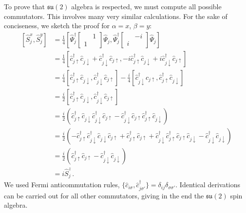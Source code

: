 \begin{tabproof}
	
	To prove that $\mathfrak{su}(2)$ algebra is respected, we must compute all possible commutators. This involves many very similar calculations. For the sake of conciseness, we sketch the proof for $\alpha=x$, $\beta=y$:
	\[
	\begin{aligned}
		\left[ \hat S_j^x, \hat S_j^y \right] &= \frac{1}{4} \left[
			\hat \Psi_j^\dagger \begin{bmatrix}
				& 1 \\
				1 &
			\end{bmatrix} \hat \Psi_j, \hat \Psi_j^\dagger \begin{bmatrix}
				& -i \\
				i &
			\end{bmatrix} \hat \Psi_j
		\right] \\
		&= \frac{1}{4} \left[
			\hat c_{j\uparrow}^\dagger \hat c_{j\downarrow} + \hat c_{j\downarrow}^\dagger \hat c_{j\uparrow}, -i\hat c_{j\uparrow}^\dagger \hat c_{j\downarrow} + i \hat c_{j\downarrow}^\dagger \hat c_{j\uparrow}
		\right] \\
		&= \frac{i}{4} \left[
			\hat c_{j\uparrow}^\dagger \hat c_{j\downarrow}, \hat c_{j\downarrow}^\dagger \hat c_{j\uparrow}
		\right] - \frac{i}{4} \left[
			\hat c_{j\downarrow}^\dagger \hat c_{j\uparrow}, \hat c_{j\uparrow}^\dagger \hat c_{j\downarrow}
		\right] \\
		&= \frac{i}{2} \left[
			\hat c_{j\uparrow}^\dagger \hat c_{j\downarrow}, \hat c_{j\downarrow}^\dagger \hat c_{j\uparrow}
		\right] \\
		&= \frac{i}{2} \left(
			\hat c_{j\uparrow}^\dagger \hat c_{j\downarrow} \hat c_{j\downarrow}^\dagger \hat c_{j\uparrow} - \hat c_{j\downarrow}^\dagger \hat c_{j\uparrow} \hat c_{j\uparrow}^\dagger \hat c_{j\downarrow}
		\right) \\
		&= \frac{i}{2} \left(
			- \hat c_{j\uparrow}^\dagger \hat c_{j\downarrow}^\dagger \hat c_{j\downarrow} \hat c_{j\uparrow} + \hat c_{j\uparrow}^\dagger \hat c_{j\uparrow} + \hat c_{j\downarrow}^\dagger \hat c_{j\uparrow}^\dagger \hat c_{j\uparrow} \hat c_{j\downarrow} - \hat c_{j\downarrow}^\dagger \hat c_{j\downarrow}
		\right) \\
		&= \frac{i}{2} \left( 
			\hat c_{j\uparrow}^\dagger \hat c_{j\uparrow} - \hat c_{j\downarrow}^\dagger \hat c_{j\downarrow}
		\right) \\
		&= i \hat S_j^z \, .
	\end{aligned}
	\]
	We used Fermi anticommutation rules, $\lbrace \hat c_{i\sigma}, \hat c_{j\sigma'}^\dagger \rbrace = \delta_{ij} \delta_{\sigma\sigma'}$. Identical derivations can be carried out for all other commutators, giving in the end the $\mathfrak{su}(2)$ spin algebra.

\end{tabproof}

